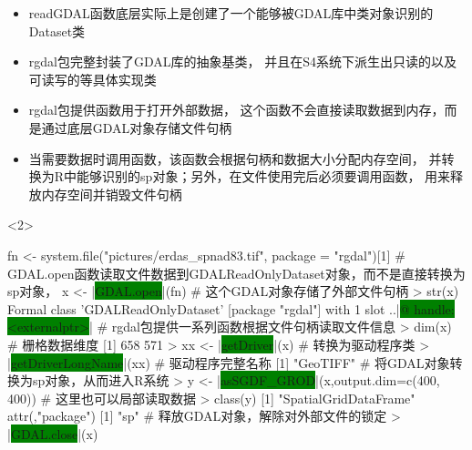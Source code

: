 \begin{frame}[t,fragile]{\subsecname}{\subsubsecname}
\begin{itemize} 
\item<1-> readGDAL函数底层实际上是创建了一个能够被GDAL库中类对象识别的Dataset类
\item<2-> rgdal包完整封装了GDAL库的抽象基类，
并且在S4系统下派生出只读的以及可读写的等具体实现类
\end{itemize}

\begin{overlayarea}{\textwidth}{\textheight}
\end{overlayarea}
\end{frame}

\begin{frame}[t,fragile]{\subsecname}{\subsubsecname}
\begin{itemize} 
\item<1-> \sloppy rgdal包提供函数用于打开外部数据，
这个函数不会直接读取数据到内存，而是通过底层GDAL对象存储文件句柄
\item<1-> 当需要数据时调用函数，该函数会根据句柄和数据大小分配内存空间，
并转换为R中能够识别的sp对象；另外，在文件使用完后必须要调用函数，
用来释放内存空间并销毁文件句柄
\end{itemize}

\begin{overlayarea}{\textwidth}{\textheight}
\begin{onlyenv}<2>
\begin{rcode}
fn <- system.file("pictures/erdas_spnad83.tif", package = "rgdal")[1]
# GDAL.open函数读取文件数据到GDALReadOnlyDataset对象，而不是直接转换为sp对象，
x <- |\colorbox{green}{GDAL.open}|(fn)
# 这个GDAL对象存储了外部文件句柄
> str(x)
Formal class 'GDALReadOnlyDataset' [package "rgdal"] with 1 slot
  ..|\colorbox{green}{@ handle:<externalptr>}|
# rgdal包提供一系列函数根据文件句柄读取文件信息
> dim(x)  # 栅格数据维度
[1] 658 571
> xx <- |\colorbox{green}{getDriver}|(x) # 转换为驱动程序类
> |\colorbox{green}{getDriverLongName}|(xx) # 驱动程序完整名称
[1] "GeoTIFF"
# 将GDAL对象转换为sp对象，从而进入R系统
> y <- |\colorbox{green}{asSGDF\_GROD}|(x,output.dim=c(400, 400)) # 这里也可以局部读取数据
> class(y)
[1] "SpatialGridDataFrame"
attr(,"package")
[1] "sp"
# 释放GDAL对象，解除对外部文件的锁定
> |\colorbox{green}{GDAL.close}|(x)
\end{rcode}
\end{onlyenv}
\end{overlayarea}
\end{frame}

